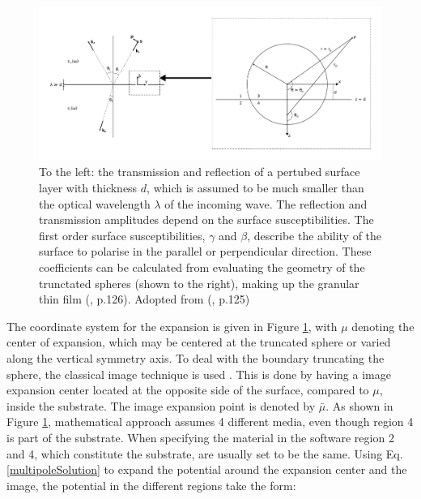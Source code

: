 \begin{figure}[h!]
  \centering
   \includegraphics[width=1.0\textwidth]{Figures/filmGeometry.pdf}
   \caption{To the left: the transmission and reflection of a pertubed surface layer with thickness $d$, 
      which is assumed to be much smaller than the optical wavelength $\lambda$ of the incoming wave.
      The reflection and transmission amplitudes depend on the surface 
      susceptibilities. The first order surface susceptibilities, $\gamma$ and $\beta$, describe
      the ability of the surface to polarise in the parallel or perpendicular direction. These
      coefficients can be calculated from evaluating the geometry of the trunctated spheres
      (shown to the right), making up
      the granular thin film (\cite{Lazzari2002}, p.126). Adopted from (\cite{Lazzari2002}, p.125)
   }
   \label{fig:filmGeometry}
\end{figure}
%
The coordinate system for the expansion is given in Figure \ref{fig:filmGeometry}, with $\mu$ denoting 
the center of expansion, which may be centered at the truncated sphere or varied along the vertical
symmetry axis. To deal with the boundary truncating the sphere, the classical image technique is used 
\cite{Lazzari2002}.
This is done by having a image expansion center located at the opposite side of the surface,
compared to $\mu$, inside the substrate. The image expansion point is denoted by $\bar{\mu}$. 
As shown in Figure \ref{fig:filmGeometry}, mathematical approach assumes 4 different media,
even though region 4 is part of the substrate. When specifying the material in the software
region 2 and 4, which constitute the substrate, are usually set to be the same.
Using Eq.\eqref{multipoleSolution} to expand the potential around the expansion center and 
the image, the potential in the different regions take the form:
%
